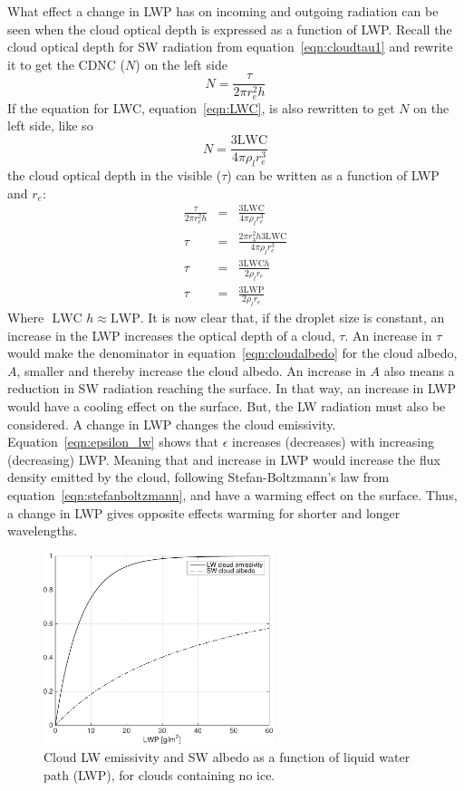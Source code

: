 What effect a change in LWP has on incoming and outgoing radiation can be seen when the cloud optical depth is expressed as a function of LWP. Recall the cloud optical depth for SW radiation from equation~\ref{eqn:cloudtau1} and rewrite it to get the CDNC ($N$) on the left side
\begin{equation}
N = \frac{\tau}{2\pi r^2_e h}
\end{equation}
If the equation for LWC, equation~\ref{eqn:LWC}, is also rewritten to get $N$ on the left side, like so
\begin{equation}
N = \frac{3\text{LWC}}{4\pi \rho_l r^3_e}
\end{equation}
the cloud optical depth in the visible ($\tau$) can be written as a function of LWP and $r_e$:
\begin{eqnarray}
\frac{\tau}{2\pi r^2_e h} &=& \frac{3\text{LWC}}{4\pi \rho_l r^3_e}\\
\tau &=& \frac{2\pi r^2_3 h 3\text{LWC}}{4\pi \rho_l r^3_e}\\
\tau &=& \frac{3\text{LWC} h}{2\rho_l r_e}\\
\tau &=& \frac{3\text{LWP}}{2\rho_l r_e}
\label{eqn:cloudtau}
\end{eqnarray}
Where $\text{ LWC }h \approx \text{LWP}$. It is now clear that, if the droplet size is constant, an increase in the LWP increases the optical depth of a cloud, $\tau$. An increase in $\tau$ would make the denominator in equation~\ref{eqn:cloudalbedo} for the cloud albedo, $A$, smaller and thereby increase the cloud albedo. An increase in $A$ also means a reduction in SW radiation reaching the surface. In that way, an increase in LWP would have a cooling effect on the surface.
But, the LW radiation must also be considered. A change in LWP changes the cloud emissivity. Equation~\ref{eqn:epsilon_lw} shows that $\epsilon$ increases (decreases) with increasing (decreasing) LWP. Meaning that and increase in LWP would increase the flux density emitted by the cloud, following Stefan-Boltzmann's law from equation~\ref{eqn:stefanboltzmann}, and have a warming effect on the surface. Thus, a change in LWP gives opposite effects warming for shorter and longer wavelengths.

\begin{figure}
\centering
\includegraphics[width=0.6\textwidth]{theory/eps_alb.pdf}
\caption{Cloud LW emissivity and SW albedo as a function of liquid water path (LWP), for clouds containing no ice.}
\label{fig:epsalb}
\end{figure}

